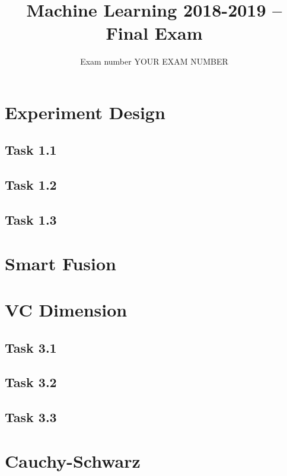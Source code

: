\documentclass[a4paper,12pt]{article}
\title{\vspace{-3cm} Machine Learning 2018-2019 -- Final Exam}
\author{Exam number YOUR EXAM NUMBER}
\begin{document}
\maketitle

\tableofcontents
\newpage 

\section{Experiment Design}

\subsection{Task 1.1}

\subsection{Task 1.2}

\subsection{Task 1.3}

\section{Smart Fusion}

\section{VC Dimension}

\subsection{Task 3.1}

\subsection{Task 3.2}

\subsection{Task 3.3}

\section{Cauchy-Schwarz}
\end{document}
